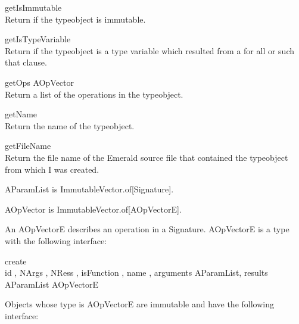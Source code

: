 \begin{desc}
  \item[\kw{function} getIsImmutable \returns{} \/\LB{}\tn{Boolean}\/\RB{}]~\\
    Return  if the typeobject is immutable.
  \item[\kw{function} getIsTypeVariable \returns{} \/\LB{}\tn{Boolean}\/\RB{}]~\\
    Return  if the typeobject is a type variable which resulted
    from a for all or such that clause.
  \item[\kw{function} getOps \returns{} \/\LB{}AOpVector\/\RB{}]~\\
    Return a list of the operations in the typeobject.
  \item[\kw{function} getName \returns{} \/\LB{}\tn{String}\/\RB{}]~\\
    Return the name of the typeobject.
  \item[\kw{function} getFileName \returns{} \/\LB{}\tn{String}\/\RB{}]~\\
    Return the file name of the Emerald source file that contained the
    typeobject from which I was created.
\end{desc}

\label{builtin AParamList}
AParamList is ImmutableVector.of[Signature].

\label{builtin AOpVector}
AOpVector is ImmutableVector.of[AOpVectorE].

\label{builtin AOpVectorE}
An AOpVectorE describes an operation in a Signature.  AOpVectorE is a type with
the following interface:

\begin{desc}
  \item[\kw{operation} create\/\LB{}]~\\
    id \CO{} ,
    NArgs \CO{} ,
    NRess \CO{} ,
    isFunction \CO{} ,
    name \CO{} ,
    arguments \CO{} AParamList,
    results \CO{} AParamList\/\RB{} \returns{} \/\LB{}AOpVectorE\/\RB{}
\end{desc}

Objects whose type is AOpVectorE are immutable and have the following
interface:

